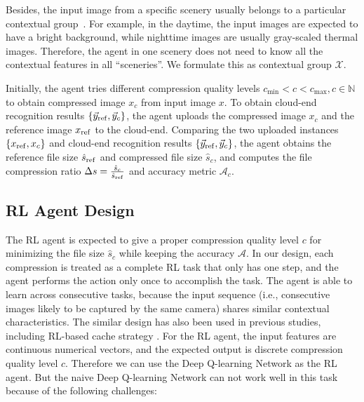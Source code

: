 Besides, the input image from a specific scenery usually belongs to a particular contextual group~\cite{mcdnn}. For example, in the daytime, the input images are expected to have a bright background, while nighttime images are usually gray-scaled thermal images. Therefore, the agent in one scenery does not need to know all the contextual features in all ``sceneries''. We formulate this as contextual group $ \mathcal{X} $.

Initially, the agent tries different compression quality levels $ c_{\min} < c < c_{\max}, c \in \mathbb{N} $ to obtain compressed image $ x_c $ from input image $ x $. To obtain cloud-end recognition results $ \{\vec{y}_{\rm ref}, \vec{y}_c\} $, the agent uploads the compressed image $ x_c $ and the reference image $ x_{\rm ref} $ to the cloud-end. Comparing the two uploaded instances $ \{x_{\rm ref}, x_c\} $ and cloud-end recognition results $ \{\vec{y}_{\rm ref}, \vec{y}_c\} $, the agent obtains the reference file size {\color{revise2}$ \hat{s}_{\rm ref} $} and compressed file size {\color{revise2}$ \hat{s}_c $}, and computes the file compression ratio {\color{revise2}$ \Delta s = \frac{\hat{s}_c}{\hat{s}_{\rm ref}} $} and accuracy metric $ \mathcal{A}_c $.

\subsection{RL Agent Design}
\label{RL Design}
The RL agent is expected to give a proper compression quality level $ c $ for minimizing the file size {\color{revise2}$ \hat{s}_c $} while keeping the accuracy $ \mathcal{A} $. {\color{revise2} In our design, each compression is treated as a complete RL task that only has one step, and the agent performs the action only once to accomplish the task. The agent is able to learn across consecutive tasks, because the input sequence (i.e., consecutive images likely to be captured by the same camera) shares similar contextual characteristics. The similar design has also been used in previous studies, including RL-based cache strategy \cite{wang2020intelligent_RL,zhong2018deep_RL,sadeghi2019deep_RL}.} For the RL agent, the input features are continuous numerical vectors, and the expected output is discrete compression quality level $ c $. Therefore we can use the Deep Q-learning Network as the RL agent. But the naive Deep Q-learning Network can not work well in this task because of the following challenges: %

